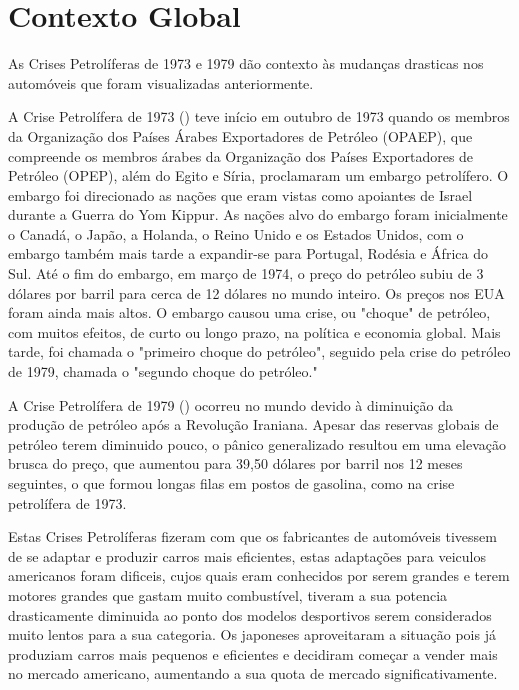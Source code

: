 \documentclass[a4paper]{article}
\begin{document}
\section{Contexto Global}\label{cg}
As Crises Petrolíferas de 1973 e 1979 dão contexto às mudanças drasticas nos automóveis que foram visualizadas anteriormente.

A Crise Petrolífera de 1973 (\cite{pet73}) teve início em outubro de 1973 quando os membros da 
Organização dos Países Árabes Exportadores de Petróleo (OPAEP), que compreende os membros árabes da 
Organização dos Países Exportadores de Petróleo (OPEP), além do Egito e Síria, proclamaram um embargo petrolífero. 
O embargo foi direcionado as nações que eram vistas como apoiantes de Israel durante a Guerra do Yom Kippur. 
As nações alvo do embargo foram inicialmente o Canadá, o Japão, a Holanda, o Reino Unido e os Estados Unidos, 
com o embargo também mais tarde a expandir-se para Portugal, Rodésia e África do Sul. Até o fim do embargo, em março de 1974, 
o preço do petróleo subiu de 3 dólares por barril para cerca de 12 dólares no mundo inteiro. Os preços nos EUA foram ainda mais altos. 
O embargo causou uma crise, ou "choque" de petróleo, com muitos efeitos, de curto ou longo prazo, na política e economia global. 
Mais tarde, foi chamada o "primeiro choque do petróleo", seguido pela crise do petróleo de 1979, chamada o "segundo choque do petróleo."

A Crise Petrolífera de 1979 (\cite{pet79}) ocorreu no mundo devido à diminuição da produção de petróleo após a Revolução Iraniana. 
Apesar das reservas globais de petróleo terem diminuido pouco, o pânico generalizado resultou em uma elevação brusca do preço, 
que aumentou para 39,50 dólares por barril nos 12 meses seguintes, o que formou longas filas em postos de gasolina, como na crise petrolífera de 1973.

Estas Crises Petrolíferas fizeram com que os fabricantes de automóveis tivessem de se adaptar e produzir carros mais eficientes, estas adaptações para 
veiculos americanos foram dificeis, cujos quais eram conhecidos por serem grandes e terem motores grandes que gastam muito combustível,
tiveram a sua potencia drasticamente diminuida ao ponto dos modelos desportivos serem considerados muito lentos para a sua categoria.
Os japoneses aproveitaram a situação pois já produziam carros mais pequenos e eficientes e decidiram começar a vender mais no mercado americano,
aumentando a sua quota de mercado significativamente.

\newpage
\renewcommand{\refname}{Bibliografia} %
\renewcommand{\bibname}{Bibliografia} %
\printbibliography
\end{document}
